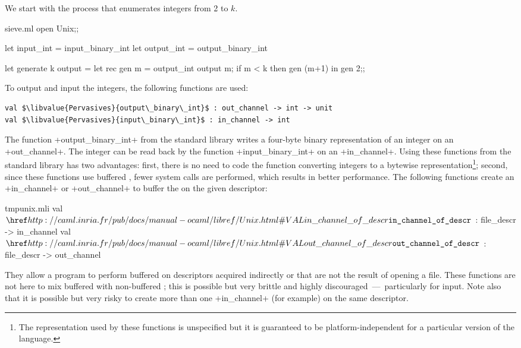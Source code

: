 
We start with the process that enumerates integers from 2 to $k$.
%
\begin{listingcodefile}{sieve.ml}
open Unix;;

let input_int = input_binary_int
let output_int = output_binary_int

let generate k output =
  let rec gen m =
    output_int output m;
    if m < k then gen (m+1)
  in 
  gen 2;;
\end{listingcodefile}
To output and input the integers, the following functions are used:
%
\begin{lstlisting}
val $\libvalue{Pervasives}{output\_binary\_int}$ : out_channel -> int -> unit
val $\libvalue{Pervasives}{input\_binary\_int}$ : in_channel -> int
\end{lstlisting}
%
The function \ml+output_binary_int+ from the standard library writes a
four-byte binary representation of an integer on an
\ml+out_channel+. The integer can be read back by the function
\ml+input_binary_int+ on an \ml+in_channel+. Using these functions
from the standard library has two advantages: first, there is no need to
code the function converting integers to a bytewise
representation\footnote{The representation used by these functions is
  unspecified but it is guaranteed to be platform-independent for a
  particular version of the language.}; second, since
these functions use buffered \io, fewer system calls are
performed, which results in better performance. The following functions
create an \ml+in_channel+ or \ml+out_channel+ to buffer the
\io{} on the given descriptor:
%
\begin{listingcodefile}{tmpunix.mli}
val $\indexlibvalue{Unix}{in\_channel\_of\_descr}$ : file_descr -> in_channel
val $\indexlibvalue{Unix}{out\_channel\_of\_descr}$ : file_descr -> out_channel
\end{listingcodefile}
%
They allow a program to perform buffered \io{} on descriptors acquired
indirectly or that are not the result of opening a file. These
functions are not here to mix buffered \io{} with non-buffered
\io; this is possible but very brittle and highly
discouraged~---~particularly for input. Note also that it is possible
but very risky to create more than one \ml+in_channel+ (for example)
on the same descriptor.

